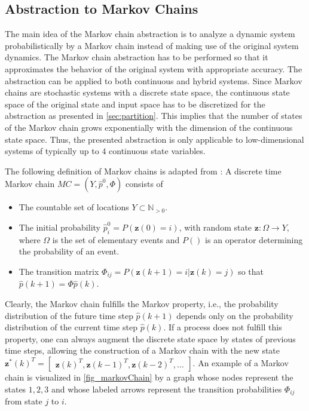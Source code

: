 \subsection{Abstraction to Markov Chains} \label{sec:MarkovChains}

The main idea of the Markov chain abstraction is to analyze a dynamic system probabilistically by a Markov chain instead of making use of the original system dynamics. The Markov chain abstraction has to be performed so that it approximates the behavior of the original system with appropriate accuracy. The abstraction can be applied to both continuous and hybrid systems. Since Markov chains are stochastic systems with a discrete state space, the continuous state space of the original state and input space has to be discretized for the abstraction as presented in \cref{sec:partition}. This implies that the number of states of the Markov chain grows exponentially with the dimension of the continuous state space. Thus, the presented abstraction is only applicable to low-dimensional systems of typically up to $4$ continuous state variables.

The following definition of Markov chains is adapted from \cite{Cassandras2009}:
A discrete time Markov chain $MC=(Y ,\hat{p}^0,\Phi)$ consists of
\begin{itemize}
\item The countable set of locations $Y \subset\mathbb{N}_{>0}$.
\item The initial probability $\hat{p}^0_i=P(\mathbf{z}(0)=i)$, with random state $\mathbf{z}:\Omega\to Y$, where $\Omega$ is the set of elementary events and $P()$ is an operator determining the probability of an event.
\item The transition matrix $\Phi_{ij}=P(\mathbf{z}(k+1)=i|\mathbf{z}(k)=j)$ so that $\hat{p}(k+1)=\Phi \hat{p}(k)$.
\end{itemize}

Clearly, the Markov chain fulfills the Markov property, i.e., the probability distribution of the future time step $\hat{p}(k+1)$ depends only on the probability distribution of the current time step $\hat{p}(k)$. If a process does not fulfill this property, one can always augment the discrete state space by states of previous time steps, allowing the construction of a Markov chain with the new state $\mathbf{z}^*(k)^T=\begin{bmatrix} \mathbf{z}(k)^T, \mathbf{z}(k-1)^T, \mathbf{z}(k-2)^T, \ldots \end{bmatrix}$. An example of a Markov chain is visualized in \cref{fig_markovChain} by a graph whose nodes represent the states $1,2,3$ and whose labeled arrows represent the transition probabilities $\Phi_{ij}$ from state $j$ to $i$.

